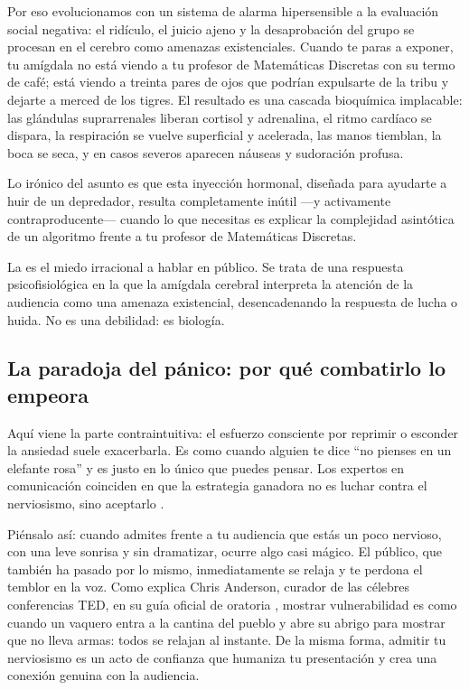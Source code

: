 Por eso evolucionamos con un sistema de alarma hipersensible a la evaluación social negativa: el ridículo, el juicio ajeno y la desaprobación del grupo se procesan en el cerebro como amenazas existenciales.
Cuando te paras a exponer, tu amígdala no está viendo a tu profesor de Matemáticas Discretas con su termo de café; está viendo a treinta pares de ojos que podrían expulsarte de la tribu y dejarte a merced de los tigres.
El resultado es una cascada bioquímica implacable: las glándulas suprarrenales liberan cortisol y adrenalina, el ritmo cardíaco se dispara, la respiración se vuelve superficial y acelerada, las manos tiemblan, la boca se seca, y en casos severos aparecen náuseas y sudoración profusa.

Lo irónico del asunto es que esta inyección hormonal, diseñada para ayudarte a huir de un depredador, resulta completamente inútil —y activamente contraproducente— cuando lo que necesitas es explicar la complejidad asintótica de un algoritmo frente a tu profesor de Matemáticas Discretas.

\begin{remember}
	\label{rem:glosofobia}
	La  es el miedo irracional a hablar en público.
	Se trata de una respuesta psicofisiológica en la que la amígdala cerebral interpreta la atención de la audiencia como una amenaza existencial, desencadenando la respuesta de lucha o huida.
	No es una debilidad: es biología.
\end{remember}

\subsection*{La paradoja del pánico: por qué combatirlo lo empeora}

Aquí viene la parte contraintuitiva: el esfuerzo consciente por reprimir o esconder la ansiedad suele exacerbarla.
Es como cuando alguien te dice “no pienses en un elefante rosa” y es justo en lo único que puedes pensar.
Los expertos en comunicación coinciden en que la estrategia ganadora no es luchar contra el nerviosismo, sino aceptarlo \cite{Hennessey2019, Anderson2016}.

Piénsalo así: cuando admites frente a tu audiencia que estás un poco nervioso, con una leve sonrisa y sin dramatizar, ocurre algo casi mágico.
El público, que también ha pasado por lo mismo, inmediatamente se relaja y te perdona el temblor en la voz.
Como explica Chris Anderson, curador de las célebres conferencias TED, en su guía oficial de oratoria \cite{Anderson2016}, mostrar vulnerabilidad es como cuando un vaquero entra a la cantina del pueblo y abre su abrigo para mostrar que no lleva armas: todos se relajan al instante.
De la misma forma, admitir tu nerviosismo es un acto de confianza que humaniza tu presentación y crea una conexión genuina con la audiencia.

